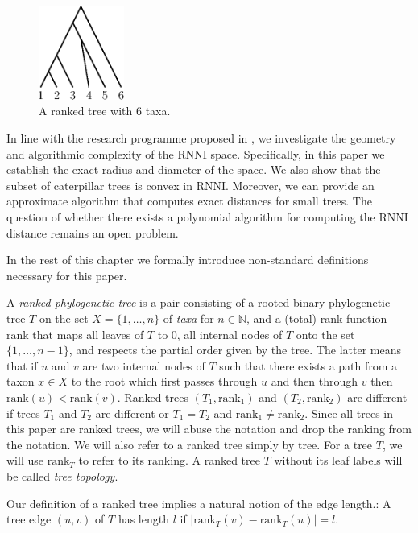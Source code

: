 \documentclass{amsart}
\newcommand{\rank}{\mathrm{rank}}
\newcommand{\rnni}{\mathrm{RNNI}}
\begin{document}
\begin{figure}[H]
	\centering
	\includegraphics[width=0.25\textwidth]{ranked_tree}
    \vspace{12pt}
	\caption{A ranked tree with $6$ taxa.}
	\label{fig:ranked_tree}
\end{figure}

In line with the research programme proposed in \autocite{Gavryushkin2018-ol}, we investigate the geometry and algorithmic complexity of the $\rnni$ space.
Specifically, in this paper we establish the exact radius and diameter of the space.
We also show that the subset of caterpillar trees is convex in $\rnni$.
Moreover, we can provide an approximate algorithm that computes exact distances for small trees.
The question of whether there exists a polynomial algorithm for computing the $\rnni$ distance remains an open problem.

In the rest of this chapter we formally introduce non-standard definitions necessary for this paper.

A \emph{ranked phylogenetic tree} is a pair consisting of a rooted binary phylogenetic tree $T$ on the set $X = \{1, \ldots, n\}$ of \emph{taxa} for $n \in \mathbb N$, and a (total) rank function $\rank$ that maps all leaves of $T$ to $0$, all internal nodes of $T$ onto the set $\{1, \ldots, n-1\}$, and respects the partial order given by the tree.
The latter means that if $u$ and $v$ are two internal nodes of $T$ such that there exists a path from a taxon $x \in X$ to the root which first passes through $u$ and then through $v$ then $\rank(u) < \rank(v)$.
Ranked trees $(T_1, \rank_1)$ and $(T_2, \rank_2)$ are different if trees $T_1$ and $T_2$ are different or $T_1 = T_2$ and $\rank_1 \neq \rank_2$.
Since all trees in this paper are ranked trees, we will abuse the notation and drop the ranking from the notation.
We will also refer to a ranked tree simply by tree.
For a tree $T$, we will use $\rank_T$ to refer to its ranking.
A ranked tree $T$ without its leaf labels will be called \emph{tree topology}.

Our definition of a ranked tree implies a natural notion of the edge length.:
A tree edge $(u,v)$ of $T$ has length $l$ if $|\rank_T(v) - \rank_T(u)| = l$.
\end{document}

